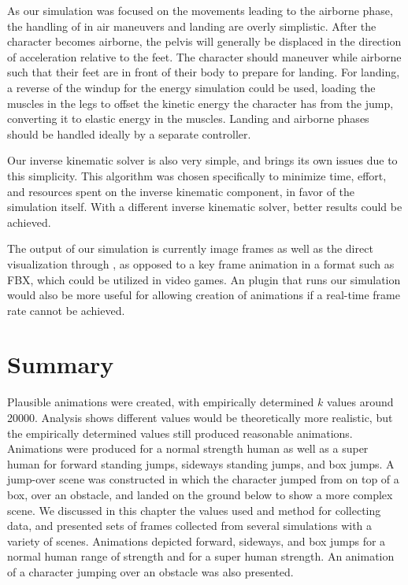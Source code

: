 As our simulation was focused on the movements leading to the airborne phase, the handling of in air maneuvers and landing are overly simplistic.  After the character becomes airborne, the pelvis will generally be displaced in the direction of acceleration relative to the feet.  The character should maneuver while airborne such that their feet are in front of their body to prepare for landing.  For landing, a reverse of the windup for the energy simulation could be used, loading the muscles in the legs to offset the kinetic energy the character has from the jump, converting it to elastic energy in the muscles.  Landing and airborne phases should be handled ideally by a separate controller.

Our inverse kinematic solver is also very simple, and brings its own issues due to this simplicity.  This algorithm was chosen specifically to minimize time, effort, and resources spent on the inverse kinematic component, in favor of the simulation itself.  With a different inverse kinematic solver, better results could be achieved.

The output of our simulation is currently image frames as well as the direct visualization through \unity{}, as opposed to a key frame animation in a format such as FBX, which could be utilized in video games.  An \maya{}  plugin that runs our simulation would also be more useful for allowing creation of animations if a real-time frame rate cannot be achieved.

\section{Summary}
\label{section:results_summary}
Plausible animations were created, with empirically determined $k$ values around 20000.  Analysis shows different values would be theoretically more realistic, but the empirically determined values still produced reasonable animations.  Animations were produced for a normal strength human as well as a super human for forward standing jumps, sideways standing jumps, and box jumps.  A jump-over scene was constructed in which the character jumped from on top of a box, over an obstacle, and landed on the ground below to show a more complex scene.  We discussed in this chapter the values used and method for collecting data, and presented sets of frames collected from several simulations with a variety of scenes.  Animations depicted forward, sideways, and box jumps for a normal human range of strength and for a super human strength.  An animation of a character jumping over an obstacle was also presented.